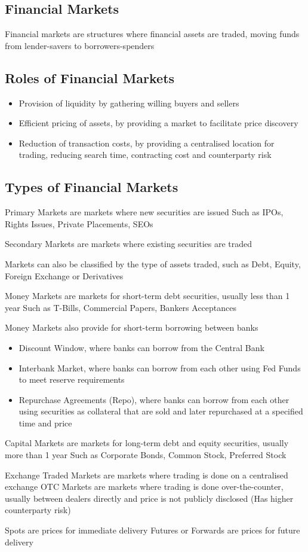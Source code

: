 \subsection{Financial Markets}
Financial markets are structures where financial assets are traded, moving funds from lender-savers to borrowers-spenders

\subsection{Roles of Financial Markets}
\begin{itemize}
    \item Provision of liquidity by gathering willing buyers and sellers
    \item Efficient pricing of assets, by providing a market to facilitate price discovery
    \item Reduction of transaction costs, by providing a centralised location for trading, reducing search time, contracting cost and counterparty risk
\end{itemize}

\subsection{Types of Financial Markets}
Primary Markets are markets where new securities are issued
Such as IPOs, Rights Issues, Private Placements, SEOs

Secondary Markets are markets where existing securities are traded

Markets can also be classified by the type of assets traded, such as Debt, Equity, Foreign Exchange or Derivatives

Money Markets are markets for short-term debt securities, usually less than 1 year
Such as T-Bills, Commercial Papers, Bankers Acceptances

Money Markets also provide for short-term borrowing between banks
\begin{itemize}
    \item Discount Window, where banks can borrow from the Central Bank
    \item Interbank Market, where banks can borrow from each other using Fed Funds to meet reserve requirements
    \item Repurchase Agreements (Repo), where banks can borrow from each other using securities as collateral
     that are sold and later repurchased at a specified time and price
\end{itemize}

Capital Markets are markets for long-term debt and equity securities, usually more than 1 year
Such as Corporate Bonds, Common Stock, Preferred Stock

Exchange Traded Markets are markets where trading is done on a centralised exchange
OTC Markets are markets where trading is done over-the-counter, usually between dealers directly and price is not publicly disclosed (Has higher counterparty risk)

Spots are prices for immediate delivery
Futures or Forwards are prices for future delivery